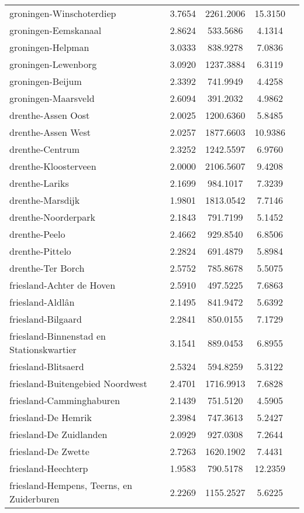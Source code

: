 \begin{longtable}{llccc}
groningen-Winschoterdiep & 3.7654 & 2261.2006 & 15.3150 \\
groningen-Eemskanaal & 2.8624 & 533.5686 & 4.1314 \\
groningen-Helpman & 3.0333 & 838.9278 & 7.0836 \\
groningen-Lewenborg & 3.0920 & 1237.3884 & 6.3119 \\
groningen-Beijum & 2.3392 & 741.9949 & 4.4258 \\
groningen-Maarsveld & 2.6094 & 391.2032 & 4.9862 \\
drenthe-Assen Oost & 2.0025 & 1200.6360 & 5.8485 \\
drenthe-Assen West & 2.0257 & 1877.6603 & 10.9386 \\
drenthe-Centrum & 2.3252 & 1242.5597 & 6.9760 \\
drenthe-Kloosterveen & 2.0000 & 2106.5607 & 9.4208 \\
drenthe-Lariks & 2.1699 & 984.1017 & 7.3239 \\
drenthe-Marsdijk & 1.9801 & 1813.0542 & 7.7146 \\
drenthe-Noorderpark & 2.1843 & 791.7199 & 5.1452 \\
drenthe-Peelo & 2.4662 & 929.8540 & 6.8506 \\
drenthe-Pittelo & 2.2824 & 691.4879 & 5.8984 \\
drenthe-Ter Borch & 2.5752 & 785.8678 & 5.5075 \\
friesland-Achter de Hoven & 2.5910 & 497.5225 & 7.6863 \\
friesland-Aldlân & 2.1495 & 841.9472 & 5.6392 \\
friesland-Bilgaard & 2.2841 & 850.0155 & 7.1729 \\
friesland-Binnenstad en Stationskwartier & 3.1541 & 889.0453 & 6.8955 \\
friesland-Blitsaerd & 2.5324 & 594.8259 & 5.3122 \\
friesland-Buitengebied Noordwest & 2.4701 & 1716.9913 & 7.6828 \\
friesland-Camminghaburen & 2.1439 & 751.5120 & 4.5905 \\
friesland-De Hemrik & 2.3984 & 747.3613 & 5.2427 \\
friesland-De Zuidlanden & 2.0929 & 927.0308 & 7.2644 \\
friesland-De Zwette & 2.7263 & 1620.1902 & 7.4431 \\
friesland-Heechterp & 1.9583 & 790.5178 & 12.2359 \\
friesland-Hempens, Teerns, en Zuiderburen & 2.2269 & 1155.2527 & 5.6225 \\

\end{longtable}
